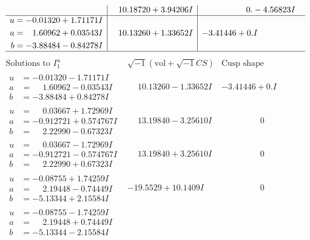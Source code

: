 \documentclass[1p]{elsarticle_modified}
\theoremstyle{definition}
\newcommand{\I}{\sqrt{-1}}
\begin{document}
$$\begin{array}{c|c|c}
 & \phantom{-}10.18720 + 3.94206 I & \phantom{-0.000000 } 0. - 4.56823 I \\ \hline\begin{aligned}
u &= -0.01320 + 1.71171 I \\
a &= \phantom{-}1.60962 + 0.03543 I \\
b &= -3.88484 - 0.84278 I\end{aligned}
 & \phantom{-}10.13260 + 1.33652 I & -3.41446 + 0. I\phantom{ +0.000000I}\\
 \hline 
 \end{array}$$\newpage$$\begin{array}{c|c|c}  
\text{Solutions to }I^u_{1}& \I (\text{vol} + \sqrt{-1}CS) & \text{Cusp shape}\\
 \hline 
\begin{aligned}
u &= -0.01320 - 1.71171 I \\
a &= \phantom{-}1.60962 - 0.03543 I \\
b &= -3.88484 + 0.84278 I\end{aligned}
 & \phantom{-}10.13260 - 1.33652 I & -3.41446 + 0. I\phantom{ +0.000000I} \\ \hline\begin{aligned}
u &= \phantom{-}0.03667 + 1.72969 I \\
a &= -0.912721 + 0.574767 I \\
b &= \phantom{-}2.22990 - 0.67323 I\end{aligned}
 & \phantom{-}13.19840 - 3.25610 I & \phantom{-0.000000 } 0 \\ \hline\begin{aligned}
u &= \phantom{-}0.03667 - 1.72969 I \\
a &= -0.912721 - 0.574767 I \\
b &= \phantom{-}2.22990 + 0.67323 I\end{aligned}
 & \phantom{-}13.19840 + 3.25610 I & \phantom{-0.000000 } 0 \\ \hline\begin{aligned}
u &= -0.08755 + 1.74259 I \\
a &= \phantom{-}2.19448 - 0.74449 I \\
b &= -5.13344 + 2.15584 I\end{aligned}
 & -19.5529 + 10.1409 I & \phantom{-0.000000 } 0 \\ \hline\begin{aligned}
u &= -0.08755 - 1.74259 I \\
a &= \phantom{-}2.19448 + 0.74449 I \\
b &= -5.13344 - 2.15584 I\end{aligned}

\end{array}$$
\end{document}
